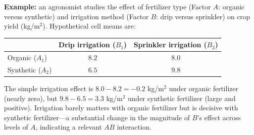 \begin{solproblema}[prob:fc779e7]
\textbf{Example:} an agronomist studies the effect of fertilizer type (Factor $A$: organic versus synthetic) and irrigation method (Factor $B$: drip versus sprinkler) on crop yield (kg/m$^2$). Hypothetical cell means are:
\begin{center}
\begin{tabular}{lcc}
\hline
 & Drip irrigation ($B_1$) & Sprinkler irrigation ($B_2$) \\ \hline
Organic ($A_1$) & $8.2$ & $8.0$ \\
Synthetic ($A_2$) & $6.5$ & $9.8$ \\ \hline
\end{tabular}
\end{center}
The simple irrigation effect is $8.0-8.2=-0.2$ kg/m$^2$ under organic fertilizer (nearly zero), but $9.8-6.5=3.3$ kg/m$^2$ under synthetic fertilizer (large and positive). Irrigation barely matters with organic fertilizer but is decisive with synthetic fertilizer—a substantial change in the magnitude of $B$'s effect across levels of $A$, indicating a relevant $AB$ interaction.
\end{solproblema}
